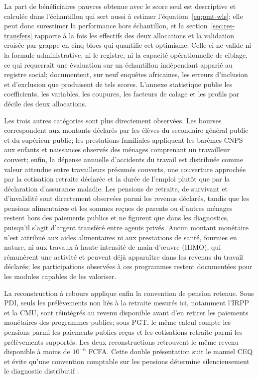 \documentclass[11pt,a4paper]{article}
\begin{document}
La part de bénéficiaires pauvres obtenue avec le score seul est descriptive et
calculée dans l'échantillon qui sert aussi à estimer
l'équation~\eqref{eq:pmt-wls}; elle peut donc surestimer la performance hors
échantillon, et la section~\ref{sec:res-transfers} rapporte à la fois les
effectifs des deux allocations et la validation croisée par grappe en cinq blocs
qui quantifie cet optimisme. Celle-ci ne valide ni la formule administrative, ni
le registre, ni la capacité opérationnelle de ciblage, ce qui requerrait une
évaluation sur un échantillon indépendant apparié au registre social;
\citet{brown2018} documentent, sur neuf enquêtes africaines, les erreurs
d'inclusion et d'exclusion que produisent de tels scores. L'annexe
statistique publie les coefficients, les variables, les coupures, les facteurs
de calage et les profils par décile des deux allocations.

Les trois autres catégories sont plus directement observées. Les bourses
correspondent aux montants déclarés par les élèves du secondaire général public
et du supérieur public; les prestations familiales appliquent les barèmes CNPS
aux enfants et naissances observés des ménages comprenant un travailleur
couvert; enfin, la dépense annuelle d'accidents du travail est distribuée comme
valeur attendue entre travailleurs présumés couverts, une couverture approchée
par la cotisation retraite déclarée et la durée de l'emploi plutôt que par la
déclaration d'assurance maladie. Les pensions de retraite, de survivant et
d'invalidité sont directement observées parmi les revenus déclarés, tandis que
les pensions alimentaires et les sommes reçues de parents ou d'autres ménages
restent hors des paiements publics et ne figurent que dans les diagnostics,
puisqu'il s'agit d'argent transféré entre agents privés. Aucun montant monétaire
n'est attribué aux aides alimentaires ni aux prestations de santé, fournies en
nature, ni aux travaux à haute intensité de main-d'\oe{}uvre (HIMO), qui
rémunèrent une activité et peuvent déjà apparaître dans les revenus du travail
déclarés; les participations observées à ces programmes restent documentées pour
les modules capables de les valoriser.

La reconstruction à rebours applique enfin la convention de pension retenue.
Sous PDI, seuls les prélèvements non liés à la retraite mesurés ici, notamment
l'IRPP et la CMU, sont réintégrés au revenu disponible avant d'en retirer les
paiements monétaires des programmes publics; sous PGT, le même calcul compte les
pensions parmi les paiements publics reçus et les cotisations retraite parmi les
prélèvements supportés. Les deux reconstructions retrouvent le même revenu
disponible à moins de $10^{-6}$ FCFA. Cette double présentation suit le manuel
CEQ et évite qu'une convention comptable sur les pensions détermine
silencieusement le diagnostic distributif \citep{lustig2022}.
\end{document}
